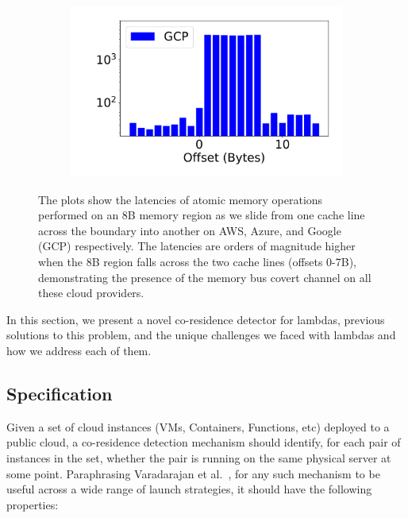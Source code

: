 \begin{figure}[h!]
\begin{subfigure}{.33\textwidth}
  \centering
  \includegraphics[width=.99\linewidth]{fig/membus_gcp.pdf}
\end{subfigure}
\caption{The plots show the latencies of atomic memory operations performed on
        an 8B memory region as we slide from one cache line across the boundary into
        another on AWS, Azure, and Google (GCP) respectively.  The latencies are orders
        of magnitude higher when the 8B region falls across the two cache lines (offsets
        0-7B), demonstrating the presence of the memory bus covert channel on all these
        cloud providers. \label{fig:membus_clouds}}
\label{fig:fig}
\end{figure}


In this section, we present a novel co-residence detector for lambdas, previous 
solutions to this problem, and the unique challenges we faced with lambdas and
how we address each of them.

\subsection{Specification}
Given a set of cloud instances (VMs, Containers, Functions, etc) deployed to a
public cloud, a co-residence detection mechanism should identify, for each pair
of instances in the set, whether the pair is running on the same physical
server at some point. Paraphrasing Varadarajan et al.~\cite{varadarajan2015},
for any such mechanism to be useful across a wide range of launch strategies, it
should have the following properties:

